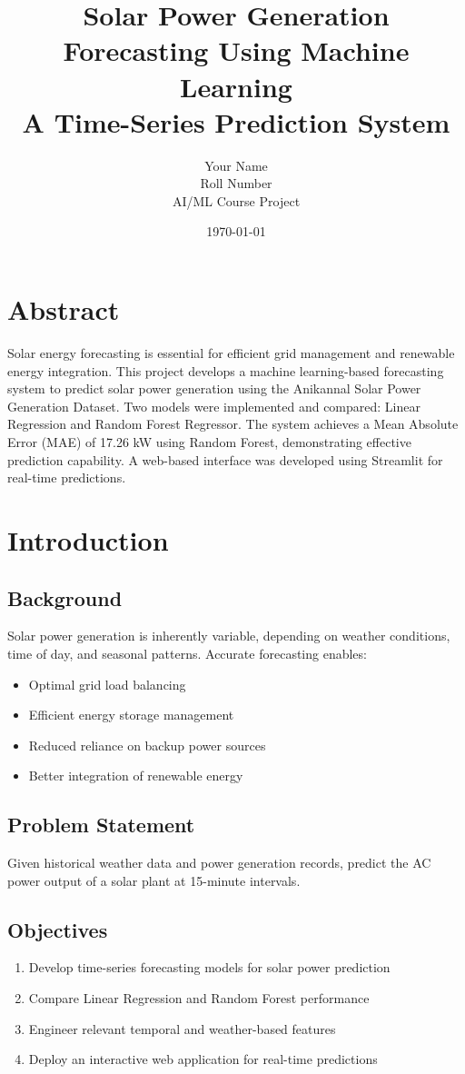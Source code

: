 \documentclass[12pt,a4paper]{article}
\title{\textbf{Solar Power Generation Forecasting Using Machine Learning} \\ \large A Time-Series Prediction System}
\author{Your Name \\ Roll Number \\ AI/ML Course Project}
\date{\today}
\begin{document}
\maketitle
\newpage

\tableofcontents
\newpage

\section{Abstract}
Solar energy forecasting is essential for efficient grid management and renewable energy integration. This project develops a machine learning-based forecasting system to predict solar power generation using the Anikannal Solar Power Generation Dataset. Two models were implemented and compared: Linear Regression and Random Forest Regressor. The system achieves a Mean Absolute Error (MAE) of 17.26 kW using Random Forest, demonstrating effective prediction capability. A web-based interface was developed using Streamlit for real-time predictions.

\section{Introduction}

\subsection{Background}
Solar power generation is inherently variable, depending on weather conditions, time of day, and seasonal patterns. Accurate forecasting enables:
\begin{itemize}
    \item Optimal grid load balancing
    \item Efficient energy storage management
    \item Reduced reliance on backup power sources
    \item Better integration of renewable energy
\end{itemize}

\subsection{Problem Statement}
Given historical weather data and power generation records, predict the AC power output of a solar plant at 15-minute intervals.

\subsection{Objectives}
\begin{enumerate}
    \item Develop time-series forecasting models for solar power prediction
    \item Compare Linear Regression and Random Forest performance
    \item Engineer relevant temporal and weather-based features
    \item Deploy an interactive web application for real-time predictions
\end{enumerate}
\end{document}
